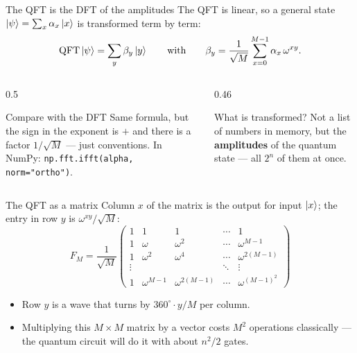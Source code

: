 \documentclass[aspectratio=169,11pt]{beamer}
\newcommand{\key}[1]{{\color{qdark}\textbf{#1}}}
\begin{document}
\begin{frame}{The QFT is the DFT of the amplitudes}
  The QFT is linear, so a general state $\ket\psi = \sum_x \alpha_x\ket x$ is transformed term by term:
  \[ \mathrm{QFT}\ket\psi = \sum_{y} \beta_y\ket y \qquad\text{with}\qquad
     \beta_y = \frac{1}{\sqrt M}\sum_{x=0}^{M-1} \alpha_x\,\omega^{xy} . \]
  \begin{columns}[T]
    \begin{column}{0.5\textwidth}
      \begin{block}{Compare with the DFT}
        Same formula, but the sign in the exponent is $+$ and there is a factor $1/\sqrt M$ --- just conventions.
        In NumPy: \texttt{np.fft.ifft(alpha, norm="ortho")}.
      \end{block}
    \end{column}
    \begin{column}{0.46\textwidth}
      \begin{exampleblock}{What is transformed?}
        Not a list of numbers in memory, but the \key{amplitudes} of the quantum state --- all $2^n$ of them at once.
      \end{exampleblock}
    \end{column}
  \end{columns}
\end{frame}

\begin{frame}{The QFT as a matrix}
  Column $x$ of the matrix is the output for input $\ket x$; the entry in row $y$ is $\omega^{xy}/\sqrt M$:
  \[ F_M = \frac{1}{\sqrt M}\begin{pmatrix}
     1 & 1 & 1 & \cdots & 1\\
     1 & \omega & \omega^2 & \cdots & \omega^{M-1}\\
     1 & \omega^2 & \omega^4 & \cdots & \omega^{2(M-1)}\\
     \vdots & & & \ddots & \vdots\\
     1 & \omega^{M-1} & \omega^{2(M-1)} & \cdots & \omega^{(M-1)^2}
  \end{pmatrix} \]
  \begin{itemize}
    \item Row $y$ is a wave that turns by $360^\circ\cdot y/M$ per column.
    \item Multiplying this $M\times M$ matrix by a vector costs $M^2$ operations classically ---
      the quantum circuit will do it with about $n^2/2$ gates.
  \end{itemize}
\end{frame}
\end{document}
